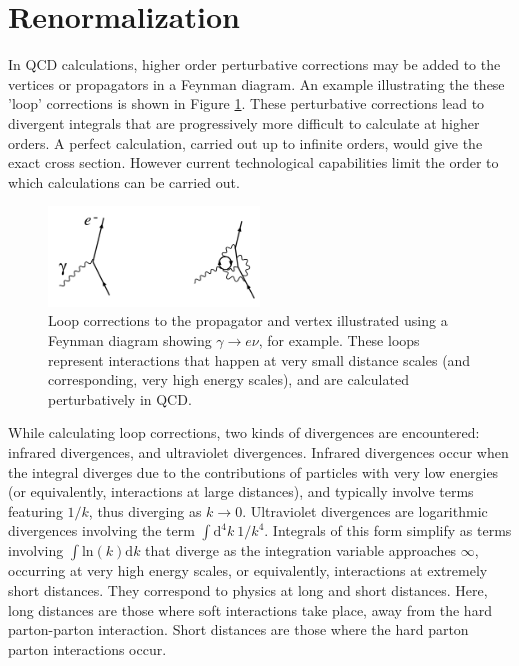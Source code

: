 \documentclass[11pt,a4paper,openright,twoside]{report}
\begin{document}
\section{Renormalization}\label{sec:renorm}
In QCD calculations, higher order perturbative corrections may be added to the vertices or propagators in a Feynman diagram. An example illustrating the these 'loop' corrections is shown in Figure \ref{fig:loop_corr}. These perturbative corrections lead to divergent integrals that are progressively more difficult to calculate at higher orders. A perfect calculation, carried out up to infinite orders, would give the exact cross section. However current technological capabilities limit the order to which calculations can be carried out.

\begin{figure}[H]
\centering
\includegraphics[width=0.5\textwidth]{renormalize_diagram.png}
\caption{Loop corrections to the propagator and vertex illustrated using a Feynman diagram showing $\gamma\to e\nu$, for example. These loops represent interactions that happen at very small distance scales (and corresponding, very high energy scales), and are calculated perturbatively in QCD.}
\label{fig:loop_corr}
\end{figure}

While calculating loop corrections, two kinds of divergences are encountered: infrared divergences, and ultraviolet divergences. Infrared divergences occur when the integral diverges due to the contributions of particles with very low energies (or equivalently, interactions at large distances), and typically involve terms featuring $1/k$, thus diverging as $k\to 0$. Ultraviolet divergences are logarithmic divergences involving the term $\int \mathrm{d}^4k\ 1/k^4$. Integrals of this form simplify as terms involving $\int \mathrm{ln}(k) \mathrm{d}k$ that diverge as the integration variable approaches $\infty$, occurring at very high energy scales, or equivalently, interactions at extremely short distances. They correspond to physics at long and short distances. Here, long distances are those where soft interactions take place, away from the hard parton-parton interaction. Short distances are those where the hard parton parton interactions occur.
\end{document}
